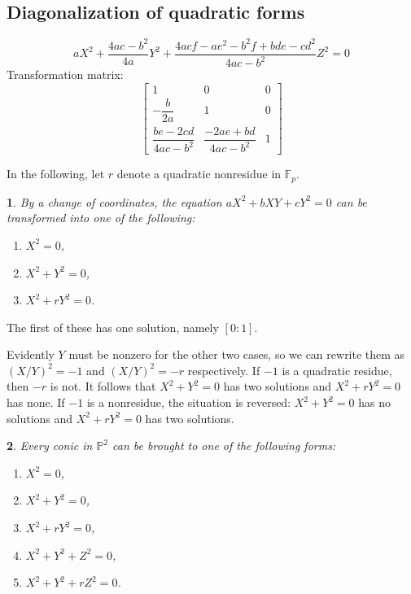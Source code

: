 \documentclass[10pt,a5paper]{amsart}
\numberwithin{equation}{section}
\numberwithin{figure}{section}
\theoremstyle{definition}
\theoremstyle{remark}
\theoremstyle{plain}
\theoremstyle{plain}
\theoremstyle{definition}
\theoremstyle{plain}
\theoremstyle{plain}
\newtheorem{lem}{\protect\lemmaname}[section]
\providecommand{\lemmaname}{Lemma}
\begin{document}
\subsection{Diagonalization of quadratic forms}
\color{blue}
\[
	aX^2 + \frac{4ac - b^2}{4a}Y^2 + \frac{4acf - ae^2 - 
	b^2 f + bde - cd^2}{4ac - b^2}Z^2 = 0
\]
Transformation matrix:
\[
	\begin{bmatrix}
		1 & 0 & 0\\
		-\dfrac{b}{2a} & 1 & 0\\
		\dfrac{be - 2cd}{4ac - b^2} & \dfrac{-2ae + bd}{4ac - b^2} & 1
	\end{bmatrix}
\]
\color{black}

In the following, let $r$ denote a quadratic nonresidue in $\mathbb{F}_p$.
\begin{lem}\label{lem:quadrics-P1}
	By a change of coordinates, the equation $aX^2 + bXY + cY^2 = 0$ can be transformed into one of the following:
	\begin{enumerate}
		\item $X^2 = 0$,
		\item $X^2 + Y^2 = 0$, \label{case:x^2+y^2=0}
		\item $X^2 + rY^2 = 0$.
	\end{enumerate}
\end{lem}

The first of these has one solution, namely $[0:1]$.

Evidently $Y$ must be nonzero for the other two cases, so we can rewrite them as $(X/Y)^2 = -1$ and $(X/Y)^2 = -r$ respectively. If $-1$ is a quadratic residue, then $-r$ is not. It follows that $X^2 + Y^2 = 0$ has two solutions and $X^2 + rY^2 = 0$ has none. If $-1$ is a nonresidue, the situation is reversed: $X^2 + Y^2 = 0$ has no solutions and $X^2 + rY^2 = 0$ has two solutions.

\begin{lem}
	Every conic in $\mathbb{P}^2$ can be brought to one of the following forms:
	\begin{enumerate}
		\item $X^2 = 0$,
		\item $X^2 + Y^2 = 0$,
		\item $X^2 + rY^2 = 0$,
		\item $X^2 + Y^2 + Z^2 = 0$,
		\item $X^2 + Y^2 + rZ^2 = 0$.
	\end{enumerate}
\end{lem}
\end{document}
